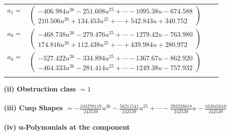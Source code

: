 \documentclass[1p]{elsarticle_modified}
\theoremstyle{definition}
\begin{document}
\begin{tabular}{m{7pt} m{180pt} m{7pt} m{180pt} }
\flushright $a_{1}=$&$\begin{pmatrix}-406.984 u^{26}-251.608 u^{25}+\cdots-1095.38 u-674.588\\210.506 u^{26}+134.453 u^{25}+\cdots+542.843 u+340.752\end{pmatrix}$ \\
\flushright $a_{9}=$&$\begin{pmatrix}-468.738 u^{26}-279.476 u^{25}+\cdots-1279.42 u-763.980\\174.816 u^{26}+112.438 u^{25}+\cdots+439.984 u+280.972\end{pmatrix}$ \\
\flushright $a_{8}=$&$\begin{pmatrix}-527.422 u^{26}-334.894 u^{25}+\cdots-1367.67 u-862.920\\-464.333 u^{26}-281.414 u^{25}+\cdots-1249.38 u-757.932\end{pmatrix}$\\&\end{tabular}
\flushleft \textbf{(ii) Obstruction class $= 1$}\\~\\
\flushleft \textbf{(iii) Cusp Shapes $= -\frac{103270119}{242539} u^{26}-\frac{56211541}{242539} u^{25}+\cdots-\frac{293238618}{242539} u-\frac{163845610}{242539}$}\\~\\
\newpage\renewcommand{\arraystretch}{1}
\flushleft \textbf{(iv) u-Polynomials at the component}\newline \\
\end{document}
